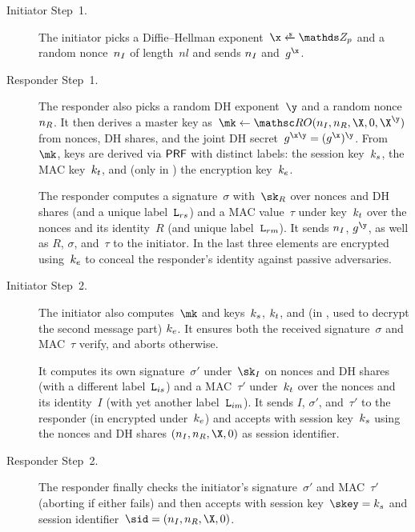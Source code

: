 \begin{description}
	\item[Initiator Step~1.]
	The initiator picks a Diffie--Hellman exponent~$\x \sample \ZZ_p$ and a random nonce~$n_I$ of length~$nl$ and sends $n_I$ and~$g^\x$.
	
	
	\item[Responder Step~1.]
	The responder also picks a random DH exponent~$\y$ and a random nonce~$n_R$.
	It then derives a master key as~$\mk \gets \RO(\nonce_I\cab \nonce_R\cab \X\cab \Y\cab \X^\y)$ from nonces, DH shares, and the joint DH secret~$g^{\x\y} = (g^\x)^\y$.
	From~$\mk$, keys are derived via $\mathsf{PRF}$ with distinct labels:
	the session key~$k_s$,
	the MAC key~$k_t$,
	and (only in \SIGMAI) the encryption key~$k_e$.
	
	The responder computes a signature~$\sigma$ with~$\sk_R$ over nonces and DH shares (and a unique label~$\mathtt{L}_{rs}$) and a MAC value~$\tau$ under key~$k_t$ over the nonces and its identity~$R$ (and unique label~$\mathtt{L}_{rm}$).
	It sends $n_I$, $g^\y$, as well as $R$, $\sigma$, and~$\tau$ to the initiator.
	In \SIGMAI the last three elements are encrypted using~$k_e$ to conceal the responder's identity against passive adversaries.
	
	
	\item[Initiator Step~2.]
	The initiator also computes~$\mk$ and keys~$k_s$, $k_t$, and (in \SIGMAI, used to decrypt the second message part) $k_e$.
	It ensures both the received signature~$\sigma$ and MAC~$\tau$ verify, and aborts otherwise.
	
	It computes its own signature~$\sigma'$ under~$\sk_I$ on nonces and DH shares (with a different label~$\mathtt{L}_{is}$)
	and a MAC~$\tau'$ under~$k_t$ over the nonces and its identity~$I$ (with yet another label~$\mathtt{L}_{im}$).
	It sends $I$, $\sigma'$, and~$\tau'$ to the responder (in \SIGMAI encrypted under~$k_e$)
	and accepts with session key~$k_s$ using the nonces and DH shares $(\nonce_I, \nonce_R, \X, \Y)$ as session identifier.
	
	\item[Responder Step~2.]
	The responder finally checks the initiator's signature~$\sigma'$ and MAC~$\tau'$ (aborting if either fails)
	and then accepts with session key~$\skey = \ks$ and session identifier~$\sid = (\nonce_I, \nonce_R, \X, \Y)$.
\end{description}
